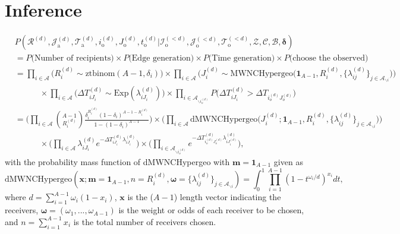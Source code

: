 \documentclass[a4paper]{article}
\begin{document}
\section{Inference}
\begin{equation}
	\begin{aligned}
		&P(\mathcal{R}^{(d)},\mathcal{J}^{(d)}_{\mbox{a}}, \mathcal{T}^{(d)}_{\mbox{a}}, i^{(d)}_{\mbox{o}}, J^{(d)}_{\mbox{o}}, t^{(d)}_{\mbox{o}} |\mathcal{I}^{(<d)}_{\mbox{o}}, \mathcal{J}^{(<d)}_{\mbox{o}}, \mathcal{T}^{(<d)}_{\mbox{o}}, \mathcal{Z}, \mathcal{C}, \mathcal{B}, \boldsymbol{\delta})\\&=P\Big(\mbox{Number of recipients}\Big) \times P\Big(\mbox{Edge generation}\Big)\times P\Big(\mbox{Time generation}\Big) \times P\Big(\mbox{choose the observed}\Big) \\&
		=\prod_{i\in \mathcal{A}} \Big(R_i^{(d)} \sim \mbox{ztbinom}(A-1, \delta_i)\Big)\times
		\prod_{i\in \mathcal{A}}\Big(J_i^{(d)}\sim \mbox{MWNCHypergeo}\Big(\mathbf{1}_{A-1}, R_i^{(d)}, \{\lambda_{ij}^{(d)}\}_{j \in \mathcal{A}_{\backslash i}} \Big)\Big) \\&\quad\quad\quad\times \prod_{i\in \mathcal{A}}\Big(\Delta T^{(d)}_{iJ_i}\sim\mbox{Exp}(\lambda^{(d)}_{iJ_i})\Big) \times \prod_{i\in \mathcal{A}_{\backslash i_o^{(d)}}} P\Big(\Delta T^{(d)}_{i{J_i}} > \Delta T_{i_{o}^{(d)}{J_{o}^{(d)}}}\Big)\\&=\Big(\prod_{i\in \mathcal{A}} {{A-1}\choose R_i^{(d)}} \frac{\delta_i^{ R_i^{(d)}} (1-\delta_i)^{A-1-R_i^{(d)}}}{1 - (1-\delta_i)^{A-1}}\Big) \times \Big(\prod_{i\in \mathcal{A}}\mbox{dMWNCHypergeo}\Big(J_i^{(d)}; \mathbf{1}_{A-1}, R_i^{(d)}, \{\lambda_{ij}^{(d)}\}_{j \in \mathcal{A}_{\backslash i}}\Big)\Big)\\&\quad\quad\quad
		\times \Big(\prod_{i \in\mathcal{A}}\lambda^{(d)}_{iJ_i}e^{-\Delta T^{(d)}_{iJ_i}\lambda^{(d)}_{iJ_i}}\Big)\times \Big( \prod_{i\in \mathcal{A}_{\backslash i_o^{(d)}}} e^{-\Delta T^{(d)}_{i_o^{(d)}J_o^{(d)}}\lambda^{(d)}_{iJ^{(d)}_{i}}}\Big),
	\end{aligned}
\end{equation}
with the probability mass function of dMWNCHypergeo with $\boldsymbol{m} =\mathbf{1}_{A-1}$ given as
\begin{equation*}
	\mbox{dMWNCHypergeo}(\boldsymbol{x}; \boldsymbol{m} =\mathbf{1}_{A-1}, n = R_i^{(d)}, \boldsymbol{\omega} = \{\lambda_{ij}^{(d)}\}_{j \in \mathcal{A}_{\backslash i}}) = \int_0^1\prod_{i=1}^{A-1}(1-t^{\omega_i / d})^{x_i}dt,
\end{equation*}
where $d = \sum_{i = 1}^{A-1} \omega_i(1-x_i)$, $\boldsymbol{x}$ is the ($A-1$) length vector indicating the receivers, $\boldsymbol{\omega} =(\omega_1,...,\omega_{A-1})$ is the weight or odds of each receiver to be chosen, and $n = \sum_{i= 1} ^{A-1} x_i$ is the total number of receivers chosen. 
\end{document}
